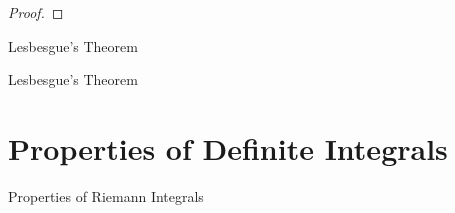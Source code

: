 \documentclass[11pt]{../../TexTemplate/elegantbook}
\begin{document}
\begin{proof}
    
\end{proof}

\begin{leftbarTitle}{Lesbesgue's Theorem}\end{leftbarTitle}

\begin{theorem}{Lesbesgue's Theorem}
    
\end{theorem}


\section{Properties of Definite Integrals}
\begin{leftbarTitle}{Properties of Riemann Integrals}\end{leftbarTitle}
\end{document}
